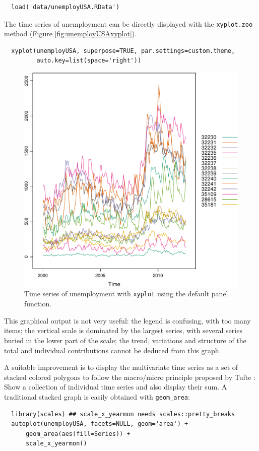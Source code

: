 \documentclass[smallroyalvopaper]{memoir}
\begin{document}
\lstset{language=r,label= ,caption= ,captionpos=b,numbers=none}
\begin{lstlisting}
  load('data/unemployUSA.RData')
\end{lstlisting}

The time series of unemployment can be directly displayed
with the \texttt{xyplot.zoo} method (Figure \ref{fig:unemployUSAxyplot}).

\lstset{language=r,label= ,caption= ,captionpos=b,numbers=none}
\begin{lstlisting}
  xyplot(unemployUSA, superpose=TRUE, par.settings=custom.theme,
         auto.key=list(space='right'))
\end{lstlisting}

\begin{figure}[htbp]
\centering
\includegraphics[width=.9\linewidth]{figs/unemployUSAxyplot.pdf}
\caption{\label{fig:org443e433}
Time series of unemployment  with \texttt{xyplot} using the default panel function.}
\end{figure}

This graphical output is not very useful: the legend is confusing,
with too many items; the vertical scale is dominated by the largest
series, with several series buried in the lower part of the scale; the
trend, variations and structure of the total and individual
contributions cannot be deduced from this graph.

A suitable improvement is to display the multivariate time series as a
set of stacked colored polygons to follow the macro/micro principle
proposed by Tufte \cite{Tufte1990}: Show a collection of individual
time series and also display their sum. A traditional stacked graph is
easily obtained with \texttt{geom\_area}:
\lstset{language=r,label= ,caption= ,captionpos=b,numbers=none}
\begin{lstlisting}
  library(scales) ## scale_x_yearmon needs scales::pretty_breaks
  autoplot(unemployUSA, facets=NULL, geom='area') +
      geom_area(aes(fill=Series)) +
      scale_x_yearmon()
\end{lstlisting}
\end{document}
